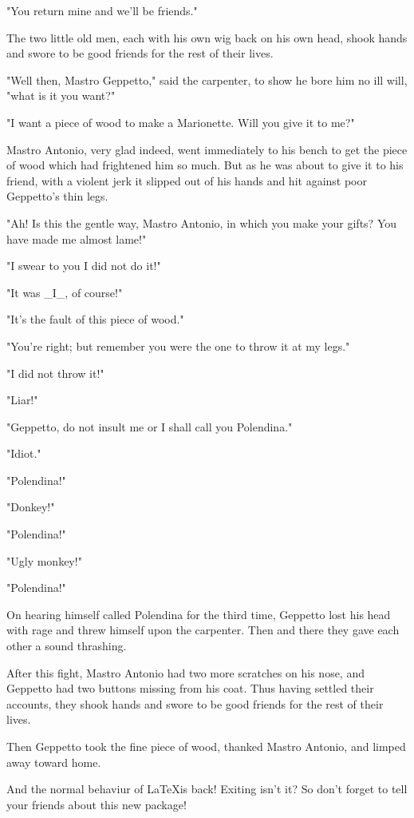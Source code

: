 \documentclass[12pt,twoside]{article}
\begin{document}
{  "You return mine and we'll be friends."
  
  The two little old men, each with his own wig back on
  his own head, shook hands and swore to be good friends
  for the rest of their lives.
  
  "Well then, Mastro Geppetto," said the carpenter, to
  show he bore him no ill will, "what is it you want?"
  
  "I want a piece of wood to make a Marionette.  Will you give it to
  me?"
    
  Mastro Antonio, very glad indeed, went immediately
  to his bench to get the piece of wood which had frightened
  him so much.  But as he was about to give it to his friend,
  with a violent jerk it slipped out of his hands and hit
  against poor Geppetto's thin legs.
  
  "Ah!  Is this the gentle way, Mastro Antonio, in which
  you make your gifts?  You have made me almost lame!"
  
  "I swear to you I did not do it!"
  
  "It was \_I\_, of course!"
  
  "It's the fault of this piece of wood."
  
  "You're right; but remember you were the one to throw it at my legs."
  
  "I did not throw it!"
  
  "Liar!"
  
  "Geppetto, do not insult me or I shall call you Polendina."
  
  "Idiot."
  
  "Polendina!"
  
  "Donkey!"
  
  "Polendina!"
  
  "Ugly monkey!"
  
  "Polendina!"
  
  On hearing himself called Polendina for the third time,
  Geppetto lost his head with rage and threw himself upon
  the carpenter.  Then and there they gave each other a
  sound thrashing.
  
  After this fight, Mastro Antonio had two more scratches
  on his nose, and Geppetto had two buttons missing from
  his coat.  Thus having settled their accounts, they shook
  hands and swore to be good friends for the rest of their lives.
  
  Then Geppetto took the fine piece of wood,
  thanked Mastro Antonio, and limped away toward home.
}
\endrotboxpages 

And the normal behaviur of \LaTeX is back!
Exiting isn't it? So don't forget to tell your friends about this new
package!
\end{document}
